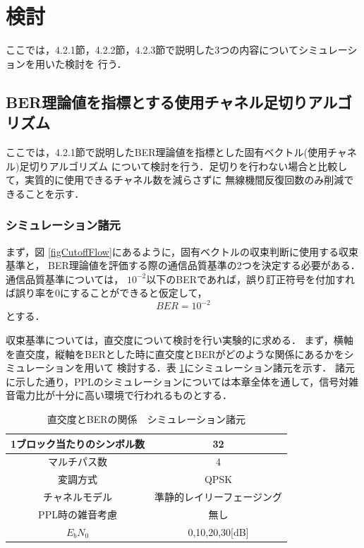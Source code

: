 \section{検討}
ここでは，4.2.1節，4.2.2節，4.2.3節で説明した3つの内容についてシミュレーションを用いた検討を
行う．

\subsection{BER理論値を指標とする使用チャネル足切りアルゴリズム}
ここでは，4.2.1節で説明したBER理論値を指標とした固有ベクトル(使用チャネル)足切りアルゴリズム
について検討を行う．足切りを行わない場合と比較して，実質的に使用できるチャネル数を減らさずに
無線機間反復回数のみ削減できることを示す．

\subsubsection{シミュレーション諸元}
まず，図 \ref{figCutoffFlow}にあるように，固有ベクトルの収束判断に使用する収束基準と，
BER理論値を評価する際の通信品質基準の2つを決定する必要がある．通信品質基準については，
$10^{-2}$以下のBERであれば，誤り訂正符号を付加すれば誤り率を0にすることができると仮定して，
\begin{equation}
    BER=10^{-2}
\end{equation}
とする．

収束基準については，直交度について検討を行い実験的に求める．
まず，横軸を直交度，縦軸をBERとした時に直交度とBERがどのような関係にあるかをシミュレーションを用いて
検討する．表 \ref{tabCutoff1}にシミュレーション諸元を示す．
諸元に示した通り，PPLのシミュレーションについては本章全体を通して，信号対雑音電力比が十分に高い環境で行われるものとする．

\begin{table}[t]
    \begin{tabular}{|c|c|} \hline
        1ブロック当たりのシンボル数 & 32 \\ \hline
        マルチパス数 & 4 \\ \hline
        変調方式 & QPSK \\ \hline
        チャネルモデル & 準静的レイリーフェージング \\ \hline
        PPL時の雑音考慮 & 無し \\ \hline
        $E_bN_0$ & 0,10,20,30[dB] \\ \hline
    \end{tabular}
    \centering
    \caption{直交度とBERの関係　シミュレーション諸元}
    \label{tabCutoff1}
\end{table}

